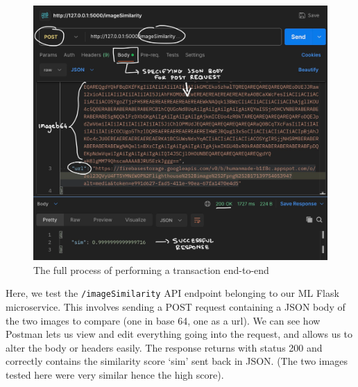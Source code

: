 \documentclass[12pt,a4paper]{article}
\begin{document}
\begin{figure}[H]
    \centering
    \includegraphics[scale=0.4]{postman2.png}
    \caption{The full process of performing a transaction end-to-end}
\end{figure}
\noindent Here, we test the \verb|/imageSimilarity| API endpoint belonging to our ML Flask microservice. This involves sending a POST request containing a JSON body of the two images to compare (one in base 64, one as a url). We can see how Postman lets us view and edit everything going into the request, and allows us to alter the body or headers easily. The response returns with status 200 and correctly contains the similarity score `sim' sent back in JSON. (The two images tested here were very similar hence the high score).
\end{document}
